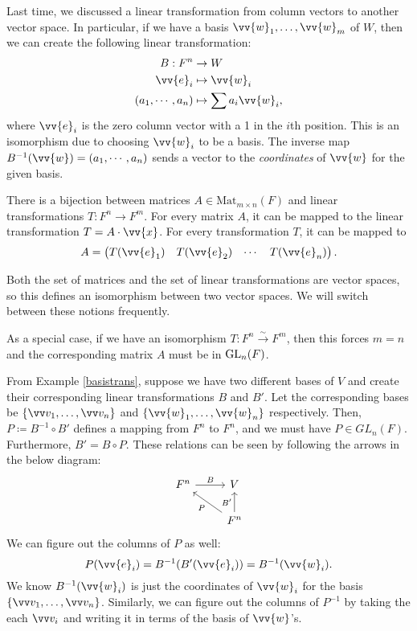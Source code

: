 \begin{example} \label{basistrans}
    Last time, we discussed a linear transformation from column vectors to another vector space. 
    In particular, if we have a basis $\vv{w}_1, \ldots, \vv{w}_m $ of $W$, then we can create the following linear transformation:
    \begin{align*}
        B: F^n &\rightarrow W \\
        \vv{e}_i & \mapsto \vv{w}_i \\
        (a_1, \cdots, a_n) &\mapsto \sum a_i \vv{w}_i,
    \end{align*}
    where $\vv{e}_i$ is the zero column vector with a 1 in the $i$th position.
    This is an isomorphism due to choosing $\vv{w}_i$ to be a basis. 
    The inverse map $B^{-1}(\vv{w}) = (a_1, \cdots, a_n)$ sends a vector to the \emph{coordinates} of $\vv{w}$ for the given basis.
\end{example}
\begin{example}
    There is a bijection between matrices $A \in \text{Mat}_{m\times n} (F)$ and linear transformations $T : F^n \rightarrow F^m$.
    For every matrix $A$, it can be mapped to the linear transformation $T = A\cdot \vv{x}$.
    For every transformation $T$, it can be mapped to 
    \[A = \begin{pmatrix} T(\vv{e}_1) & T(\vv{e}_2) &\cdots  & T(\vv{e}_n) \end{pmatrix}. \]

    Both the set of matrices and the set of linear transformations are vector spaces, so this defines an isomorphism between two vector spaces. We will switch between these notions frequently.

    As a special case, if we have an isomorphism $T : F^n \xrightarrow{\sim} F^m$, then this forces $m = n$ and the corresponding matrix $A$ must be in $\operatorname{GL}_n(F)$.
\end{example}
From Example \ref{basistrans}, suppose we have two different bases of $V$ and create their corresponding linear transformations $B$ and $B'$. Let the corresponding bases be $\{\vvv_1, \ldots, \vvv_n \}$ and $\{ \vv{w}_1, \ldots, \vv{w}_n \}$ respectively.
Then, $P \coloneqq B^{-1} \circ B'$ defines a mapping from $F^n$ to $F^n$, and we must have $P \in GL_n(F)$.
Furthermore, $B' = B \circ P$. These relations can be seen by following the arrows in the below diagram:
\[
\begin{tikzcd}
F^n \arrow[r, "B"] & V \\
& F^n \arrow[lu, "P"] \arrow[u, "B'"]
\end{tikzcd}
\]
We can figure out the columns of $P$ as well: 
\[P(\vv{e}_i) = B^{-1} (B'(\vv{e}_i)) = B^{-1}(\vv{w}_i).\]
We know $B^{-1}(\vv{w}_i)$ is just the coordinates of $\vv{w}_i$ for the basis $\{\vvv_1, \ldots, \vvv_n \}$. 
Similarly, we can figure out the columns of $P^{-1}$ by taking the each $\vvv_i$ and writing it in terms of the basis of $\vv{w}$'s.


